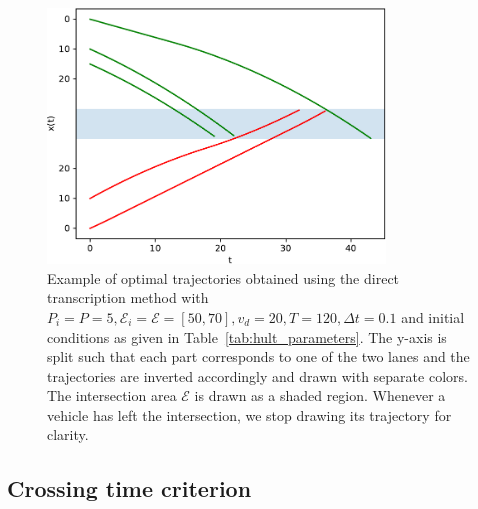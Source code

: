 \documentclass[a4paper]{article}
\theoremstyle{definition}
\theoremstyle{plain}
\begin{document}
\begin{figure}[H]
  \centering
  \includegraphics[width=0.8\textwidth]{figures/single/trajectories_general.pdf}
  \caption{Example of optimal trajectories obtained using the direct
    transcription method with
    $P_{i} = P = 5, \mathcal{E}_{i} = \mathcal{E} = [50, 70], v_{d} = 20, T=120, \Delta t = 0.1$
    and initial conditions as given in Table~\ref{tab:hult_parameters}. The
    y-axis is split such that each part corresponds to one of the two lanes and
    the trajectories are inverted accordingly and drawn with separate colors.
    The intersection area $\mathcal{E}$ is drawn as a shaded region. Whenever a
    vehicle has left the intersection, we stop drawing its trajectory for
    clarity.}
  \label{fig:direct_transcription_example}
\end{figure}


\subsection*{Crossing time criterion}
\end{document}
